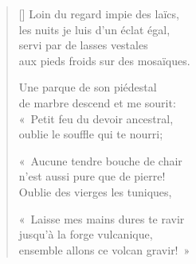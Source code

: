 \documentclass[11pt,a4paper]{article}
\begin{document}
\thispagestyle{empty}


\settowidth{\versewidth}{aux pieds froids sur des mosaïques.}

\bigskip

\begin{verse}[\versewidth]
  Loin du regard impie des laïcs, \\
  les nuits je luis d'un éclat égal, \\
  servi par de lasses vestales \\
  aux pieds froids sur des mosaïques.

  Une parque de son piédestal \\
  de marbre descend et me sourit: \\
  «~Petit feu du devoir ancestral, \\
  oublie le souffle qui te nourri;

  «~Aucune tendre bouche de chair \\
  n'est aussi pure que de pierre! \\
  Oublie des vierges les tuniques,

  «~Laisse mes mains dures te ravir \\
  jusqu'à la forge vulcanique, \\
  ensemble allons ce volcan gravir!~»
\end{verse}
\end{document}
